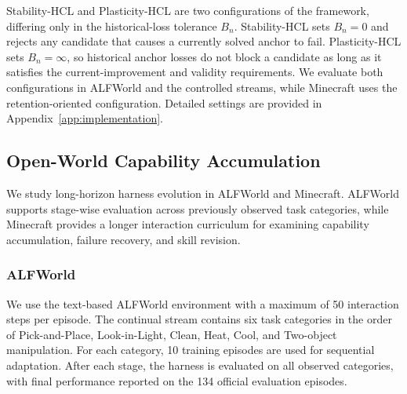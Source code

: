 \documentclass{article}
\begin{document}
Stability-HCL and Plasticity-HCL are two configurations of the framework, differing only in the historical-loss tolerance $B_n$. Stability-HCL sets
$B_n=0$ and rejects any candidate that causes a currently solved anchor to
fail. Plasticity-HCL sets $B_n=\infty$, so historical anchor losses do not
block a candidate as long as it satisfies the current-improvement and validity
requirements. We evaluate both
configurations in ALFWorld and the controlled streams, while Minecraft uses
the retention-oriented configuration. Detailed settings are provided in
Appendix~\ref{app:implementation}.
\subsection{Open-World Capability Accumulation}
\label{sec:open_world_experiments}

We study long-horizon harness evolution in ALFWorld and
Minecraft. ALFWorld supports stage-wise evaluation across
previously observed task categories, while Minecraft provides a longer
interaction curriculum for examining capability accumulation, failure
recovery, and skill revision.

\subsubsection{ALFWorld}
\label{sec:alfworld_experiment}

We use the text-based ALFWorld environment with a maximum of 50 interaction
steps per episode. The continual stream contains six task categories in the
order of Pick-and-Place, Look-in-Light, Clean, Heat, Cool, and Two-object
manipulation. For each category, 10 training episodes are used for sequential
adaptation. After each stage, the harness is evaluated on all observed
categories, with final performance reported on the 134 official evaluation
episodes.
\end{document}
